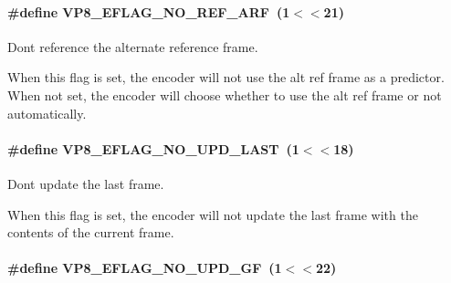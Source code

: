 \paragraph[{\texorpdfstring{V\+P8\+\_\+\+E\+F\+L\+A\+G\+\_\+\+N\+O\+\_\+\+R\+E\+F\+\_\+\+A\+RF}{VP8_EFLAG_NO_REF_ARF}}]{\setlength{\rightskip}{0pt plus 5cm}\#define V\+P8\+\_\+\+E\+F\+L\+A\+G\+\_\+\+N\+O\+\_\+\+R\+E\+F\+\_\+\+A\+RF~(1$<$$<$21)}\hypertarget{group__vp8__encoder_ga650ab0baea12be91082226a5cc18776a}{}\label{group__vp8__encoder_ga650ab0baea12be91082226a5cc18776a}


Don\textquotesingle{}t reference the alternate reference frame. 

When this flag is set, the encoder will not use the alt ref frame as a predictor. When not set, the encoder will choose whether to use the alt ref frame or not automatically. 
\paragraph[{\texorpdfstring{V\+P8\+\_\+\+E\+F\+L\+A\+G\+\_\+\+N\+O\+\_\+\+U\+P\+D\+\_\+\+L\+A\+ST}{VP8_EFLAG_NO_UPD_LAST}}]{\setlength{\rightskip}{0pt plus 5cm}\#define V\+P8\+\_\+\+E\+F\+L\+A\+G\+\_\+\+N\+O\+\_\+\+U\+P\+D\+\_\+\+L\+A\+ST~(1$<$$<$18)}\hypertarget{group__vp8__encoder_ga602edb6b02a89cb2db7a16d6dffba583}{}\label{group__vp8__encoder_ga602edb6b02a89cb2db7a16d6dffba583}


Don\textquotesingle{}t update the last frame. 

When this flag is set, the encoder will not update the last frame with the contents of the current frame. 
\paragraph[{\texorpdfstring{V\+P8\+\_\+\+E\+F\+L\+A\+G\+\_\+\+N\+O\+\_\+\+U\+P\+D\+\_\+\+GF}{VP8_EFLAG_NO_UPD_GF}}]{\setlength{\rightskip}{0pt plus 5cm}\#define V\+P8\+\_\+\+E\+F\+L\+A\+G\+\_\+\+N\+O\+\_\+\+U\+P\+D\+\_\+\+GF~(1$<$$<$22)}\hypertarget{group__vp8__encoder_gab01d066c5236457d345ce1cab4c41d6b}{}\label{group__vp8__encoder_gab01d066c5236457d345ce1cab4c41d6b}


